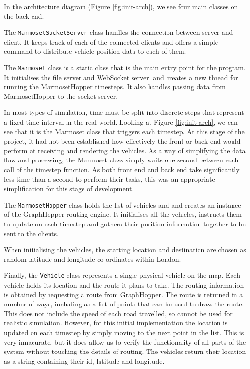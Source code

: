 \documentclass[ %
                    author={Alexander Hill},
                supervisor={Dr. Benjamin Sach},
                    degree={MEng},
                     title={MARMOSET},
                  subtitle={Multi-Agent Route Management using Online Simulation for Efficient Transportation},
                      type={research},
                      year={2016} ]{dissertation}
\begin{document}
In the architecture diagram (Figure \ref{fig:init-arch}), we see four main
classes on the back-end.

The \texttt{MarmosetSocketServer} class handles the connection between server
and client.  It keeps track of each of the connected clients and offers a simple
command to distribute vehicle position data to each of them.

The \texttt{Marmoset} class is a static class that is the main entry point for
the program. It initialises the file server and WebSocket server, and creates a
new thread for running the MarmosetHopper timesteps. It also handles passing
data from MarmosetHopper to the socket server.

In most types of simulation, time must be split into discrete steps that
represent a fixed time interval in the real world. Looking at Figure
\ref{fig:init-arch}, we can see that it is the Marmoset class that triggers each
timestep. At this stage of the project, it had not been established how
effectively the front or back end would perform at receiving and rendering the
vehicles. As a way of simplifying the data flow and processing, the Marmoset
class simply waits one second between each call of the timestep function.  As
both front end and back end take significantly less time than a second to
perform their tasks, this was an appropriate simplification for this stage of
development.

The \texttt{MarmosetHopper} class holds the list of vehicles and and creates an
instance of the GraphHopper routing engine. It initialises all the vehicles,
instructs them to update on each timestep and gathers their position information
together to be sent to the clients.

When initialising the vehicles, the starting location and destination are chosen
as random latitude and longitude co-ordinates within London.

Finally, the \texttt{Vehicle} class represents a single physical vehicle on the
map. Each vehicle holds its location and the route it plans to take. The routing
information is obtained by requesting a route from GraphHopper. The route is
returned in a number of ways, including as a list of points that can be used to
draw the route. This does not include the speed of each road travelled, so
cannot be used for realistic simulation. However, for this initial
implementation the location is updated on each timestep by simply moving to the
next point in the list. This is very innacurate, but it does allow us to verify
the functionality of all parts of the system without touching the details of
routing. The vehicles return their location as a string containing their id,
latitude and longitude.
\end{document}
